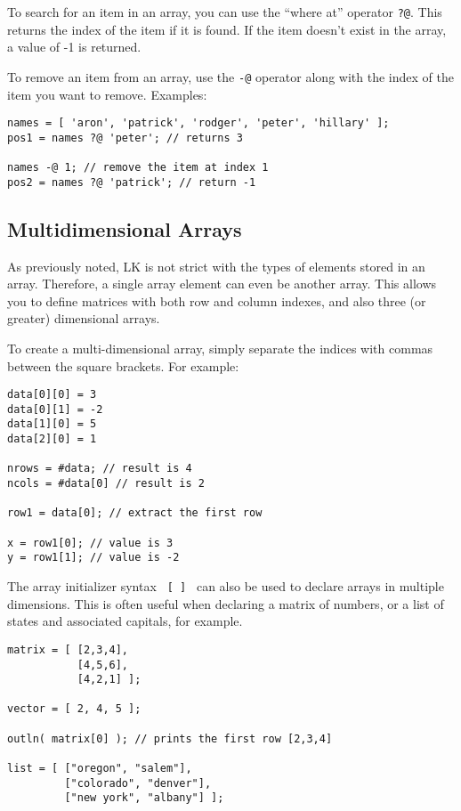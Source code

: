 \documentclass{article}
\begin{document}
To search for an item in an array, you can use the ``where at'' operator \texttt{?@}.  This returns the index of the item if it is found.  If the item doesn't exist in the array, a value of -1 is returned.

To remove an item from an array, use the \texttt{-@} operator along with the index of the item you want to remove.  Examples:

\begin{verbatim}
names = [ 'aron', 'patrick', 'rodger', 'peter', 'hillary' ];
pos1 = names ?@ 'peter'; // returns 3

names -@ 1; // remove the item at index 1
pos2 = names ?@ 'patrick'; // return -1
\end{verbatim}

\subsection{Multidimensional Arrays}

As previously noted, LK is not strict with the types of elements stored in an array.  Therefore, a single array element can even be another array.  This allows you to define matrices with both row and column indexes, and also three (or greater) dimensional arrays.

To create a multi-dimensional array, simply separate the indices with commas between the square brackets.  For example:

\begin{verbatim}
data[0][0] = 3
data[0][1] = -2
data[1][0] = 5
data[2][0] = 1

nrows = #data; // result is 4
ncols = #data[0] // result is 2

row1 = data[0]; // extract the first row

x = row1[0]; // value is 3
y = row1[1]; // value is -2
\end{verbatim}

The array initializer syntax \texttt{ [ ] } can also be used to declare arrays in multiple dimensions.  This is often useful when declaring a matrix of numbers, or a list of states and associated capitals, for example.

\begin{verbatim}
matrix = [ [2,3,4],
           [4,5,6],
           [4,2,1] ];

vector = [ 2, 4, 5 ];

outln( matrix[0] ); // prints the first row [2,3,4]

list = [ ["oregon", "salem"],
         ["colorado", "denver"],
         ["new york", "albany"] ];
         
\end{verbatim}
\end{document}

